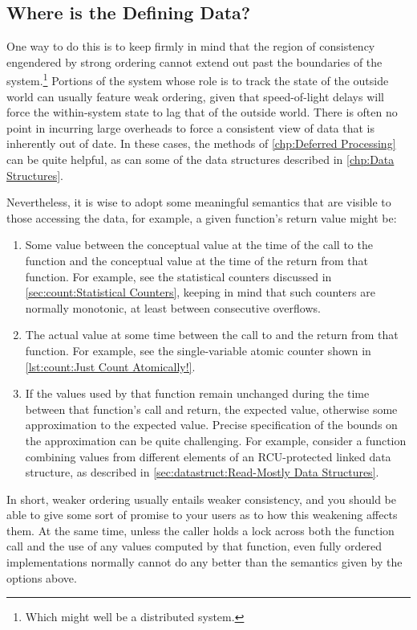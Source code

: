 \subsection{Where is the Defining Data?}
\label{sec:app:questions:Where is the Defining Data?}

One way to do this is to keep firmly in mind that the region of
consistency engendered by strong ordering cannot extend out past the
boundaries of the system.\footnote{
	Which might well be a distributed system.}
Portions of the system whose role is to track the state of the outside
world can usually feature weak ordering, given that speed-of-light delays
will force the within-system state to lag that of the outside world.
There is often no point in incurring large overheads to force a consistent
view of data that is inherently out of date.
In these cases, the methods of \cref{chp:Deferred Processing} can be
quite helpful, as can some of the data structures described in
\cref{chp:Data Structures}.

Nevertheless, it is wise to adopt some meaningful semantics that are
visible to those accessing the data, for example, a given function's
return value might be:

\begin{enumerate}
\item	Some value between the conceptual value at the time of the call
	to the function and the conceptual value at the time of the
	return from that function.
	For example, see the statistical counters discussed in
	\cref{sec:count:Statistical Counters}, keeping in mind that such
	counters are normally monotonic, at least between consecutive
	overflows.
\item	The actual value at some time between the call to and the return
	from that function.
	For example, see the single-variable atomic counter shown in
	\cref{lst:count:Just Count Atomically!}.
\item	If the values used by that function remain unchanged during the
	time between that function's call and return, the expected
	value, otherwise some approximation to the expected value.
	Precise specification of the bounds on the approximation can
	be quite challenging.
	For example, consider a function combining values from
	different elements of an RCU-protected linked data structure,
	as described in \cref{sec:datastruct:Read-Mostly Data Structures}.
\end{enumerate}

In short, weaker ordering usually entails weaker consistency, and
you should be able to give some sort of promise to your users as
to how this weakening affects them.
At the same time, unless the caller holds a lock across both the
function call and the use of any values computed by that function,
even fully ordered implementations normally cannot do any better
than the semantics given by the options above.


